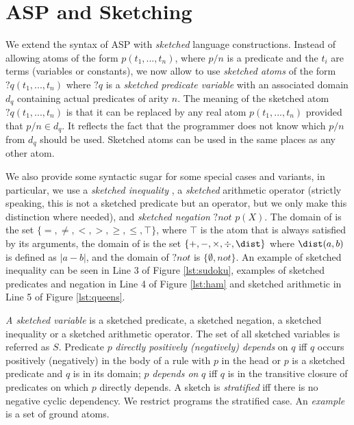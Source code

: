 \section{ASP and Sketching }\label{sec:formal}
We extend the syntax of ASP with \textit{sketched} language constructions. 
Instead of allowing atoms of the form $p(t_1, ...,t_n)$, where $p/n$ is a predicate
and the $t_i$ are terms (variables or constants), we now allow to use
{\em sketched atoms} of the form $?q(t_1, ...,t_n)$ where $?q$ is a {\em sketched predicate variable}
with an associated domain $d_q$ containing actual predicates of arity $n$. 
The meaning of the sketched atom $?q(t_1, ... ,t_n)$ is that it can be replaced
by any real atom $p(t_1, ...,t_n)$ provided that $p/n \in d_q$.
It reflects the fact that the programmer does not know which $p/n$ from $ d_q$ should be used. 
Sketched atoms can be used in the same places as any other atom. 

We also provide some syntactic sugar for some special cases and variants,
in particular, we use a {\em sketched inequality} \sketchedeq, a  {\em sketched} arithmetic operator \sketchedplus (strictly speaking, this is not a sketched predicate but an operator, but we only make this distinction where needed), and {\em sketched negation} ${?}\textit{not } p(X)$.  The domain of \sketchedeq is the set $\{=,\neq,<,>,\geq,\leq,\top\}$, where $\top$ is the atom that is always satisfied by its arguments, the domain of \sketchedplus is the set $\{ +, -, \times, \div, \dist \}$ where $\dist(a,b)$ is defined as $| a - b |$, and the domain of ${?}\textit{not}$  is $\{\emptyset, not\}$. An example of sketched inequality can be seen in Line 3 of Figure \ref{lst:sudoku}, examples of sketched predicates and negation in Line 4 of Figure \ref{lst:ham} and sketched arithmetic in Line 5 of Figure \ref{lst:queens}.


\textit{A sketched variable} is a sketched predicate, a sketched negation, a sketched inequality or a sketched arithmetic operator. The set of all sketched variables is referred as $S$. 
Predicate $p$ \textit{directly positively (negatively) depends} on $q$ iff $q$ occurs positively (negatively) in the body of a rule with $p$ in the head or $p$ is a sketched predicate and $q$ is in its domain; $p$ {\em depends on} $q$ iff $q$ is in the transitive closure of predicates on which $p$ directly depends. A sketch is \textit{stratified} iff there is no negative cyclic dependency. We restrict programs the stratified case.
An \textit{example} is a set of ground atoms. 

